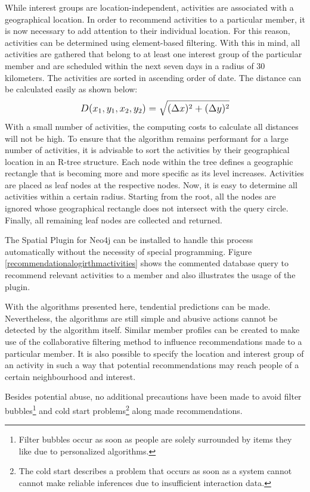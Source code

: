 \documentclass[12pt,numbers=noenddot,parskip,bibliography=totocnumbered,listof=totocnumbered,draft]{scrreprt}
\begin{document}
While interest groups are location-independent, activities are associated with a geographical location. In order to recommend activities to a particular member, it is now necessary to add attention to their individual location. For this reason, activities can be determined using element-based filtering. With this in mind, all activities are gathered that belong to at least one interest group of the particular member and are scheduled within the next seven days in a radius of 30 kilometers. The activities are sorted in ascending order of date. The distance can be calculated easily as shown below:
\[
\mathlarger{D(x_1, y_1, x_2, y_2) = \sqrt{(\Delta x)^2+(\Delta y)^2}}
\]
With a small number of activities, the computing costs to calculate all distances will not be high. To ensure that the algorithm remains performant for a large number of activities, it is advisable to sort the activities by their geographical location in an R-tree structure. Each node within the tree defines a geographic rectangle that is becoming more and more specific as its level increases. Activities are placed as leaf nodes at the respective nodes. Now, it is easy to determine all activities within a certain radius. Starting from the root, all the nodes are ignored whose geographical rectangle does not intersect with the query circle. Finally, all remaining leaf nodes are collected and returned.

The Spatial Plugin \citep{spatial} for Neo4j can be installed to handle this process automatically without the necessity of special programming. Figure \ref{recommendationalogirthmactivities} shows the commented database query to recommend relevant activities to a member and also illustrates the usage of the plugin. 

With the algorithms presented here, tendential predictions can be made. Nevertheless, the algorithms are still simple and abusive actions cannot be detected by the algorithm itself. Similar member profiles can be created to make use of the collaborative filtering method to influence recommendations made to a particular member. It is also possible to specify the location and interest group of an activity in such a way that potential recommendations may reach people of a certain neighbourhood and interest.

Besides potential abuse, no additional precautions have been made to avoid filter bubbles\footnote{Filter bubbles occur as soon as people are solely surrounded by items they like due to personalized algorithms.} and cold start problems\footnote{The cold start describes a problem that occurs as soon as a system cannot cannot make reliable inferences due to insufficient interaction data.} along made recommendations.
\end{document}
